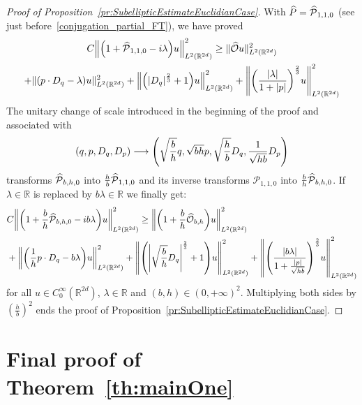 \documentclass[10pt]{amsart}
\theoremstyle{definition}\newtheorem{defi}[theo]{Definition}\newtheorem{rema}[theo]{Remark}\newtheorem{exam}[theo]{Example}\newtheorem{exem}[theo]{Example}\newtheorem{nota}[theo]{Notation}
\newcommand{\R}{\mathbb{R}}
\newcommand{\clO}{\mathcal{O}}
\newcommand{\clP}{\mathcal{P}}
\let\oldhat\hat
\renewcommand*{\hat}[1]{\mathchoice{\widehat{#1}}{\widehat{#1}}{\oldhat{#1}}{\oldhat{#1}}}
\let\originalleft\left
\let\originalright\right
\renewcommand{\left}{\mathopen{}\mathclose\bgroup\originalleft}
\renewcommand{\right}{\aftergroup\egroup\originalright}
\renewcommand*{\to}{\mathchoice{\longrightarrow}{\rightarrow}{\rightarrow}{\rightarrow}}
\begin{document}
\begin{proof}[{Proof of Proposition~\ref{pr:SubellipticEstimateEuclidianCase}}]
With $\hat{P}=\hat{\clP}_{1,1,0}$ (see just before~\eqref{conjugation_partial_FT}), we have proved
\begin{multline*}
C\left\| \left(1+\hat{\clP}_{1,1,0}-i\lambda\right)u\right\|^{2}_{L^2(\R^{2d})} \geq \| \hat{\clO}u\|^{2}_{L^2(\R^{2d})}\\
+ \| (p\cdot D_{q}-\lambda)u\|^{2}_{L^2(\R^{2d})}
+ \left\|\left(|D_{q}|^{\frac{2}{3}}+1\right)u\right\|^{2}_{L^2(\R^{2d})} +
\left\|
\left(
\frac{|\lambda|}{1+|p|}
\right)^{\frac{2}{3}} u
\right\|^{2}_{L^2(\R^{2d})}
\end{multline*}
The unitary change of scale introduced in the beginning of the proof and associated with
\[
(q,p,D_q,D_p) \to\left(\sqrt{\frac{b}{h}}q, \sqrt{bh}p, \sqrt{\frac{h}{b}} D_q, \frac{1}{\sqrt{hb}}D_p\right)
\]
transforms $\hat{\clP}_{b,h,0}$ into $\frac{h}{b}\hat{\clP}_{1,1,0}$ and its inverse transforms $\clP_{1,1,0}$ into $\frac{b}{h}\hat{\clP}_{b,h,0}$. If $\lambda\in\R$ is replaced by $b\lambda\in\R$ we finally get:
\begin{align*}
&C\left\| \left(1+\frac{b}{h}\hat{\clP}_{b,h,0}-ib\lambda\right)u \right\|^{2}_{L^2(\R^{2d})} \geq
\left\| \left(1+\frac{b}{h}\hat{\clO}_{b,h}\right)u\right\|^{2}_{L^2(\R^{2d})}\\&+\left\|\left(\frac{1}{h}p\cdot D_{q}-b\lambda\right)u\right\|^{2}_{L^2(\R^{2d})}
+ \left\|\left(\left|\sqrt{\frac{b}{h}}D_{q}\right|^{\frac{2}{3}}+1\right)u\right\|^{2}_{L^2(\R^{2d})} +
\left\|
\left(
\frac{|b\lambda|}{1+\frac{|p|}{\sqrt{hb}}}
\right)^{\frac{2}{3}} u
\right\|^{2}_{L^2(\R^{2d})}
\end{align*}
for all $u \in C^\infty_0(\R^{2d})$, $\lambda \in \R$ and $(b,h)\in(0,+\infty)^{2}$. Multiplying both sides by $(\frac{h}{b})^2$ ends the proof of Proposition~\ref{pr:SubellipticEstimateEuclidianCase}.
\end{proof}



\section{Final proof of Theorem~\ref{th:mainOne}}\label{sec:finalproof}
\end{document}
